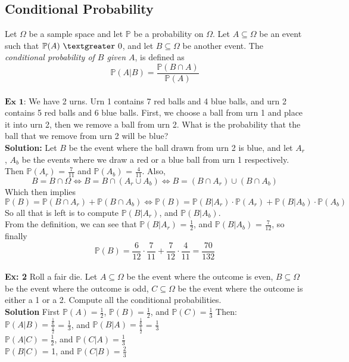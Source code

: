 \documentclass{article}
\newcommand{\bbP}{\mathbb{P}}
\newcommand{\Om}{\Omega}
\newcommand{\gt}{\textgreater}
\begin{document}
\subsection{Conditional Probability}
Let $\Om$ be a sample space and let $\bbP$ be a probability on $\Om$. Let $A \subseteq \Om$ be an event such that $\bbP(A)\ \gt\ 0$, and let $B \subseteq \Om$ be another event. The \textit{conditional probability of $B$ given $A$}, is defined as
\[ \bbP(A|B) = \frac{\bbP(B \cap A)}{\bbP(A)}\]\\
$\textbf{Ex 1:}$ We have 2 urns. Urn 1 contains 7 red balls and 4 blue balls, and urn 2 contains 5 red balls and 6 blue balls. First, we choose a ball from urn 1 and place it into urn 2, then we remove a ball from urn 2. What is the probability that the ball that we remove from urn 2 will be blue?\\
\textbf{Solution:} Let $B$ be the event where the ball drawn from urn 2 is blue, and let $A_{r}$, $A_{b}$ be the events where we draw a red or a blue ball from urn 1 respectively. Then $\bbP(A_{r})$ = $\frac{7}{11}$ and $\bbP(A_{b})$ = $\frac{4}{11}$. Also,
\[B = B \cap \Om \iff B = B \cap (A_{r} \cup A_{b}) \iff B = (B \cap A_{r}) \cup (B \cap A_{b})\]
Which then implies
\[\bbP(B) = \bbP(B \cap A_{r}) + \bbP(B \cap A_{b}) \iff \bbP(B) = \bbP(B|A_{r}) \cdot \bbP(A_{r}) + \bbP(B|A_{b}) \cdot \bbP(A_{b})\]
So all that is left is to compute $\bbP(B|A_{r})$, and $\bbP(B|A_{b})$.\\
From the definition, we can see that $\bbP(B|A_{r})$ = $\frac{1}{2}$, and $\bbP(B|A_{b})$ = $\frac{7}{12}$, so finally
\[ \bbP(B) = \frac{6}{12} \cdot \frac{7}{11} + \frac{7}{12} \cdot \frac{4}{11} = \frac{70}{132} \]\\
\textbf{Ex: 2} Roll a fair die. Let $A \subseteq \Om$ be the event where the outcome is even, $B \subseteq \Om$ be the event where the outcome is odd, $C \subseteq \Om$ be the event where the outcome is either a 1 or a 2. Compute all the conditional probabilities.\\
\textbf{Solution} First $\bbP(A) = \frac{1}{2}$, $\bbP(B) = \frac{1}{2}$, and $\bbP(C) = \frac{1}{3}$ Then:\\
$\bbP(A|B) = \frac{\frac{1}{6}}{\frac{1}{2}}$ = $\frac{1}{3}$, and $\bbP(B|A) = \frac{\frac{1}{6}}{\frac{1}{2}}$ = $\frac{1}{3}$\\
$\bbP(A|C) = \frac{1}{2}$, and $\bbP(C|A) = \frac{1}{3}$\\
$\bbP(B|C)$ = 1, and $\bbP(C|B) = \frac{2}{3}$\\
\end{document}
